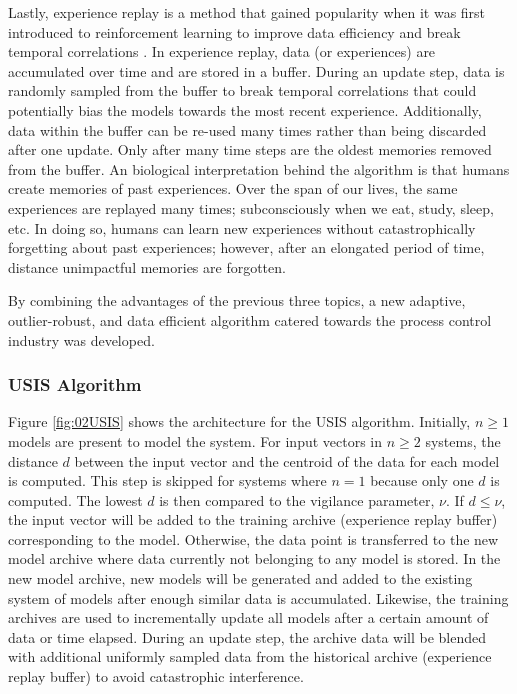 Lastly, experience replay is a method that gained popularity when it was first introduced to reinforcement learning to improve data efficiency and break temporal correlations \cite{dqn}. In experience replay, data (or experiences) are accumulated over time and are stored in a buffer.  During an update step, data is randomly sampled from the buffer to break temporal correlations that could potentially bias the models towards the most recent experience.  Additionally, data within the buffer can be re-used many times rather than being discarded after one update. Only after many time steps are the oldest memories removed from the buffer. An biological interpretation behind the algorithm is that humans create memories of past experiences.  Over the span of our lives, the same experiences are replayed many times; subconsciously when we eat, study, sleep, etc.  In doing so, humans can learn new experiences without catastrophically forgetting about past experiences; however, after an elongated period of time, distance unimpactful memories are forgotten.

By combining the advantages of the previous three topics, a new adaptive, outlier-robust, and data efficient algorithm catered towards the process control industry was developed.

\subsubsection{USIS Algorithm}

Figure \ref{fig:02USIS} shows the architecture for the USIS algorithm.  Initially, $n \geq 1$ models are present to model the system.  For input vectors in $n \geq 2$ systems, the distance $d$ between the input vector and the centroid of the data for each model is computed. This step is skipped for systems where $n = 1$ because only one $d$ is computed. The lowest $d$ is then compared to the vigilance parameter, $\nu$.  If $d \leq \nu$, the input vector will be added to the training archive (experience replay buffer) corresponding to the model.  Otherwise, the data point is transferred to the new model archive where data currently not belonging to any model is stored. In the new model archive, new models will be generated and added to the existing system of models after enough similar data is accumulated. Likewise, the training archives are used to incrementally update all models after a certain amount of data or time elapsed. During an update step, the archive data will be blended with additional uniformly sampled data from the historical archive (experience replay buffer) to avoid catastrophic interference. 

